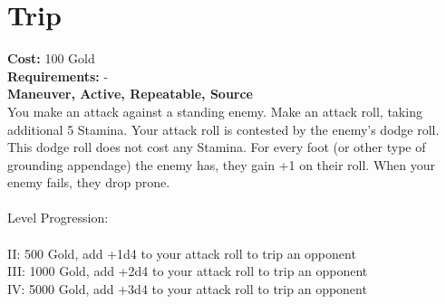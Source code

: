 \section{Trip}
\textbf{Cost:} 100 Gold\\
\textbf{Requirements:} -\\
\textbf{Maneuver, Active, Repeatable, Source}\\
You make an attack against a standing enemy. Make an attack roll, taking additional 5 Stamina. Your attack roll is contested by the enemy's dodge roll. This dodge roll does not cost any Stamina. For every foot (or other type of grounding appendage) the enemy has, they gain +1 on their roll. When your enemy fails, they drop prone. \\
\\
Level Progression:\\
\\
II: 500 Gold, add +1d4 to your attack roll to trip an opponent\\
III: 1000 Gold, add +2d4 to your attack roll to trip an opponent\\
IV: 5000 Gold, add +3d4 to your attack roll to trip an opponent\\